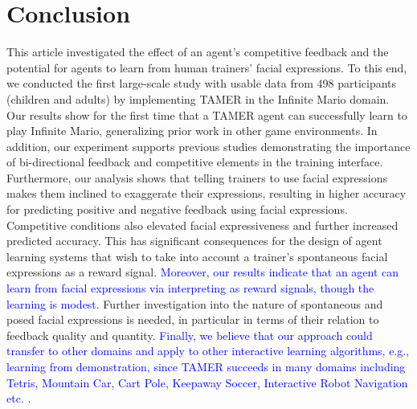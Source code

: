\section{Conclusion}%
\label{sec:con}
This article investigated the effect of an agent's competitive feedback and the potential for agents to learn from human trainers' facial expressions.
To this end, we conducted the first large-scale study with usable data from 498 participants (children and adults) by implementing TAMER in the Infinite Mario domain. Our results show for the first time that a TAMER agent can successfully learn to play Infinite Mario, generalizing prior work in other game environments. In addition, our experiment supports previous studies demonstrating the importance of bi-directional feedback and competitive elements in the training interface. %
Furthermore, %
our analysis shows that telling trainers to use facial expressions makes them inclined to exaggerate their expressions, resulting in higher accuracy for predicting positive and negative feedback using facial expressions. Competitive conditions also elevated facial expressiveness and further increased predicted accuracy. This has significant consequences for the design of agent learning systems that wish to take into account a trainer's spontaneous facial expressions as a reward signal. \textcolor{blue}{Moreover, our results indicate that an agent can learn from facial expressions via interpreting as reward signals, though the learning is modest.} Further investigation into the nature of spontaneous and posed facial expressions is needed, in particular in terms of their relation to feedback quality and quantity.
\textcolor{blue}{Finally, we believe that our approach could transfer to other domains and apply to other interactive learning algorithms, e.g., learning from demonstration, %
since TAMER succeeds in many domains including Tetris, Mountain Car, Cart Pole, Keepaway Soccer, Interactive Robot Navigation etc. \cite{knox2012learning,knox2013training}.} %

